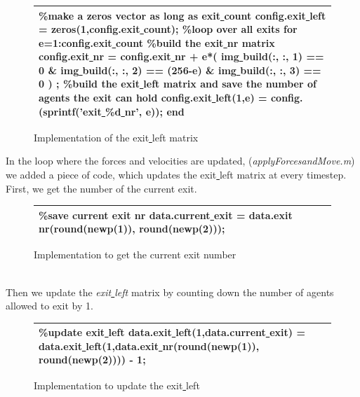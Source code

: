 \documentclass[11pt]{article}
\begin{document}
\begin{figure}[H]
\centering
\begin{tabular}
{|>{\large}m{\textwidth}|} \hline
\bigskip
\textcolor{commentcolor}{\%make a zeros vector as long as exit\underline{ }count}
\newline
config.exit\underline{ }left = zeros(1,config.exit\underline{ }count);
\newline
\textcolor{commentcolor}{\%loop over all exits}
\newline
\textcolor{keywordcolor}{for} e=1:config.exit\underline{ }count
\newline
\textcolor{commentcolor}{\%build the exit\underline{ }nr matrix}
\newline
config.exit\underline{ }nr = config.exit\underline{ }nr + e*( img\underline{ }build(:, :, 1) == 0 \& img\underline{ }build(:, :, 2) == (256-e) \& img\underline{ }build(:, :, 3) == 0 ) ;
\newline
\textcolor{commentcolor}{\%build the exit\underline{ }left matrix and save the number of agents the exit can hold}
\newline
config.exit\underline{ }left(1,e) = config.(sprintf(\textcolor{stringcolor}{'exit\underline{ }\%d\underline{ }nr'}, e)); 
\newline
\textcolor{keywordcolor}{end}
\bigskip
\\ \hline
\end{tabular}
\caption{Implementation of the exit\underline{ }left matrix}
\end{figure}
\bigskip
In the loop where the forces and velocities are updated, (\textit{applyForcesandMove.m}) we added a piece of code, which updates the exit\underline{ }left matrix at every timestep.
\newline
First, we get the number of the current exit.
\begin{figure}[h!]
\centering
\begin{tabular}
{|>{\large}m{\textwidth}|} \hline
\bigskip
\textcolor{commentcolor}{\%save current exit nr}
\newline
data.current\underline{ }exit = data.exit\underline{ }nr(round(newp(1)), round(newp(2)));
\bigskip
\\ \hline
\end{tabular}
\caption{Implementation to get the current exit number}
\end{figure}
\\
Then we update the \textit{exit\underline{ }left} matrix by counting down the number of agents allowed to exit by 1. 
\begin{figure}[h!]
\centering
\begin{tabular}
{|>{\large}m{\textwidth}|} \hline
\bigskip
\textcolor{commentcolor}{\%update exit\underline{ }left}
\newline
data.exit\underline{ }left(1,data.current\underline{ }exit) = data.exit\underline{ }left(1,data.exit\underline{ }nr(round(newp(1)), round(newp(2)))) - 1;
\bigskip
\\ \hline
\end{tabular}
\caption{Implementation to update the exit\underline{ }left}
\end{figure}
\end{document}
